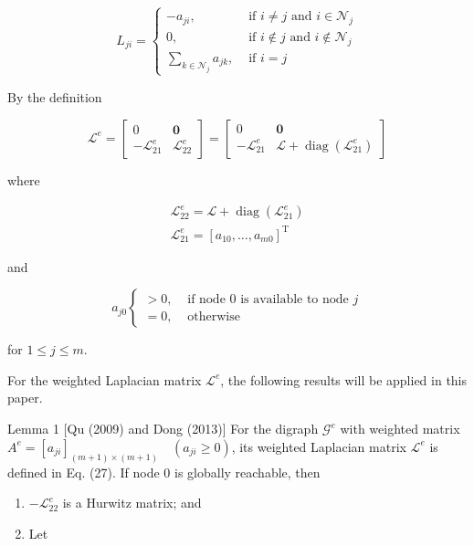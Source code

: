 \documentclass[10pt]{article}
\begin{document}
$$
L_{j i}= \begin{cases}-a_{j i}, & \text { if } i \neq j \text { and } i \in \mathcal{N}_{j} \\ 0, & \text { if } i \notin j \text { and } i \notin \mathcal{N}_{j} \\ \sum_{k \in \mathcal{N}_{j}} a_{j k}, & \text { if } i=j\end{cases}
$$

By the definition

$$
\mathcal{L}^{e}=\left[\begin{array}{cc}
0 & \mathbf{0} \\
-\mathcal{L}_{21}^{e} & \mathcal{L}_{22}^{e}
\end{array}\right]=\left[\begin{array}{cc}
0 & \mathbf{0} \\
-\mathcal{L}_{21}^{e} & \mathcal{L}+\operatorname{diag}\left(\mathcal{L}_{21}^{e}\right)
\end{array}\right]
$$

where

$$
\begin{gathered}
\mathcal{L}_{22}^{e}=\mathcal{L}+\operatorname{diag}\left(\mathcal{L}_{21}^{e}\right) \\
\mathcal{L}_{21}^{e}=\left[a_{10}, \ldots, a_{m 0}\right]^{\mathrm{T}}
\end{gathered}
$$

and

$$
a_{j 0}\left\{\begin{array}{cc}
>0, & \text { if node } 0 \text { is available to node } j \\
=0, & \text { otherwise }
\end{array}\right.
$$

for $1 \leq j \leq m$.

For the weighted Laplacian matrix $\mathcal{L}^{e}$, the following results will be applied in this paper.

Lemma 1 [Qu (2009) and Dong (2013)] For the digraph $\mathcal{G}^{e}$ with weighted matrix $A^{e}=\left[a_{j i}\right]_{(m+1) \times(m+1)} \quad\left(a_{j i} \geq 0\right)$, its weighted Laplacian matrix $\mathcal{L}^{e}$ is defined in Eq. (27). If node 0 is globally reachable, then

\begin{enumerate}
  \item $-\mathcal{L}_{22}^{e}$ is a Hurwitz matrix; and

  \item Let

\end{enumerate}
\end{document}
